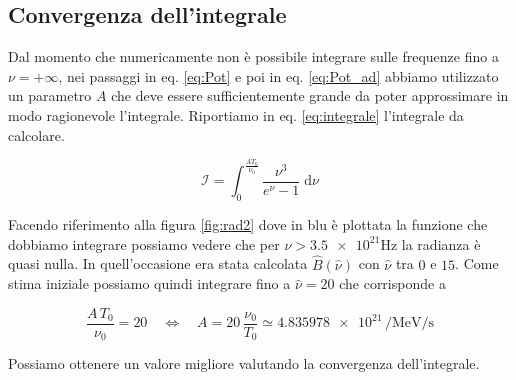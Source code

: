 \documentclass[a4paper, titlepage]{article}
\begin{document}
\subsection{Convergenza dell'integrale}
Dal momento che numericamente non è possibile integrare sulle frequenze fino a
$\nu = + \infty$, nei passaggi in eq. \ref{eq:Pot} e poi in eq. \ref{eq:Pot_ad}
abbiamo utilizzato un parametro $A$ che deve essere sufficientemente grande da
poter approssimare in modo ragionevole l'integrale.
Riportiamo in eq. \ref{eq:integrale} l'integrale da calcolare.

\begin{equation}
    \mathcal{I} = \int_0^{\frac{A T_0}{\nu_0}}
    \frac{\nu^3}{e^{\nu} - 1} \; \mathrm{d} \nu 
    \label{eq:integrale}
\end{equation}

Facendo riferimento alla figura \ref{fig:rad2} dove in blu è plottata la
funzione che dobbiamo integrare possiamo vedere che per
$\nu > \num{3.5e21} \unit{\hertz}$ la radianza è quasi nulla.
In quell'occasione era stata calcolata $\hat B(\hat \nu)$ con $\hat \nu$ tra $0$
e $15$. Come stima iniziale possiamo quindi integrare fino a $\hat \nu = 20$ che
corrisponde a

\begin{equation}
    \frac{A \, T_0}{\nu_0} = 20
    \quad \iff \quad
    A = 20 \, \frac{\nu_0}{T_0} \simeq \num{4.835978e21} \, \unit{\per\mega\electronvolt\per\second}
    \label{eq:A}
\end{equation}

Possiamo ottenere un valore migliore valutando la convergenza dell'integrale.
\end{document}
